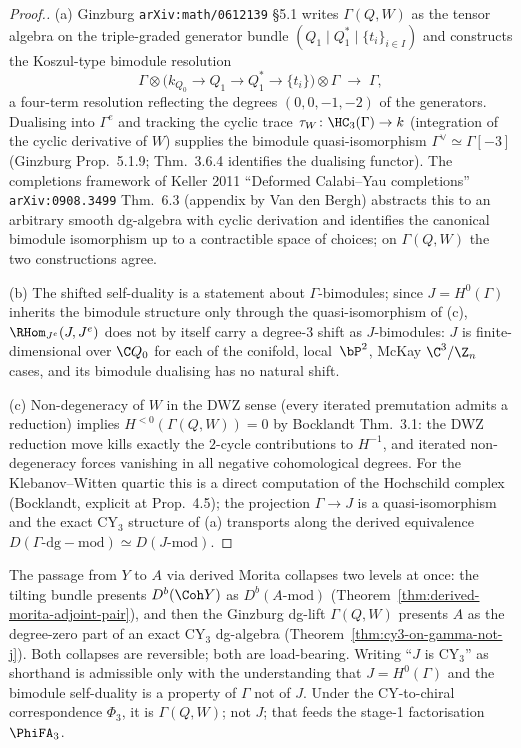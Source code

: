 \begin{proof}[Proof.]
(a) Ginzburg \texttt{arXiv:math/0612139} \S5.1 writes $\Gamma(Q, W)$ as the tensor algebra on the triple-graded generator bundle $(Q_1 \mid Q_1^{*} \mid \{t_i\}_{i \in I})$ and constructs the Koszul-type bimodule resolution
\[
 \Gamma \otimes \bigl(k_{Q_0} \to Q_1 \to Q_1^{*} \to \{t_i\}\bigr) \otimes \Gamma
 \;\to\; \Gamma,
\]
a four-term resolution reflecting the degrees $(0, 0, -1, -2)$ of the generators. Dualising into $\Gamma^{e}$ and tracking the cyclic trace $\tau_W \colon \HC_{3}(\Gamma) \to k$ (integration of the cyclic derivative of $W$) supplies the bimodule quasi-isomorphism $\Gamma^{\vee} \simeq \Gamma[-3]$ (Ginzburg Prop.~5.1.9; Thm.~3.6.4 identifies the dualising functor). The completions framework of Keller 2011 ``Deformed Calabi--Yau completions'' \texttt{arXiv:0908.3499} Thm.~6.3 (appendix by Van den Bergh) abstracts this to an arbitrary smooth dg-algebra with cyclic derivation and identifies the canonical bimodule isomorphism up to a contractible space of choices; on $\Gamma(Q, W)$ the two constructions agree.

(b) The shifted self-duality is a statement about $\Gamma$-bimodules; since $J = H^{0}(\Gamma)$ inherits the bimodule structure only through the quasi-isomorphism of (c), $\RHom_{J^{e}}(J, J^{e})$ does not by itself carry a degree-$3$ shift as $J$-bimodules: $J$ is finite-dimensional over $\C Q_0$ for each of the conifold, local~$\bP^2$, McKay $\C^3/\Z_n$ cases, and its bimodule dualising has no natural shift.

(c) Non-degeneracy of $W$ in the DWZ sense (every iterated premutation admits a reduction) implies $H^{<0}(\Gamma(Q, W)) = 0$ by Bocklandt Thm.~3.1: the DWZ reduction move kills exactly the $2$-cycle contributions to $H^{-1}$, and iterated non-degeneracy forces vanishing in all negative cohomological degrees. For the Klebanov--Witten quartic this is a direct computation of the Hochschild complex (Bocklandt, explicit at Prop.~4.5); the projection $\Gamma \to J$ is a quasi-isomorphism and the exact CY$_3$ structure of (a) transports along the derived equivalence $D(\Gamma\text{-}\mathrm{dg{-}mod}) \simeq D(J\text{-}\mathrm{mod})$.
\end{proof}

The passage from $Y$ to $A$ via derived Morita collapses two levels at once: the tilting bundle presents $D^{b}(\Coh Y)$ as $D^{b}(A\text{-}\mathrm{mod})$ (Theorem~\ref{thm:derived-morita-adjoint-pair}), and then the Ginzburg dg-lift $\Gamma(Q, W)$ presents $A$ as the degree-zero part of an exact CY$_3$ dg-algebra (Theorem~\ref{thm:cy3-on-gamma-not-j}). Both collapses are reversible; both are load-bearing. Writing ``$J$ is CY$_3$'' as shorthand is admissible only with the understanding that $J = H^{0}(\Gamma)$ and the bimodule self-duality is a property of $\Gamma$ not of $J$. Under the CY-to-chiral correspondence $\Phi_3$, it is $\Gamma(Q, W)$; not $J$; that feeds the stage-1 factorisation $\PhiFA_3$.


